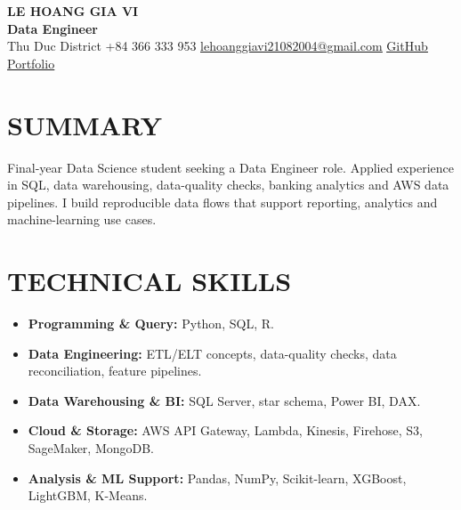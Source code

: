 \documentclass[10pt,letterpaper]{article}
\newcommand{\cvsection}[2]{\section*{\faIcon{#1}\hspace{0.45em}#2}}
\newcommand{\cvlink}[2]{\href{#1}{\underline{#2}}}
\newcommand{\cvitem}[1]{\item \small #1}
\begin{document}
\begin{center}
  {\fontsize{20}{22}\selectfont\bfseries LE HOANG GIA VI}\\[0.22em]
  {\fontsize{17}{19}\selectfont\bfseries Data Engineer}\\[0.42em]
  {\small
  \hspace{0.2em}Thu Duc District
  \quad
  \hspace{0.2em}+84 366 333 953
  \quad
  \hspace{0.2em}\cvlink{mailto:lehoanggiavi21082004@gmail.com}{lehoanggiavi21082004@gmail.com}
  \quad
  \hspace{0.2em}\cvlink{https://github.com/lehoanggiavi}{GitHub}
  \quad
  \hspace{0.2em}\cvlink{https://lehoanggiavi.github.io/portfolio/?role=de}{Portfolio}}
\end{center}

\cvsection{user}{SUMMARY}
\normalsize
Final-year Data Science student seeking a Data Engineer role. Applied experience in SQL, data
warehousing, data-quality checks, banking analytics and AWS data pipelines. I build reproducible
data flows that support reporting, analytics and machine-learning use cases.

\cvsection{tools}{TECHNICAL SKILLS}
\begin{itemize}[leftmargin=1.55em,itemsep=0em,topsep=0em,parsep=0em]
  \cvitem{\textbf{Programming \& Query:} Python, SQL, R.}
  \cvitem{\textbf{Data Engineering:} ETL/ELT concepts, data-quality checks, data reconciliation, feature pipelines.}
  \cvitem{\textbf{Data Warehousing \& BI:} SQL Server, star schema, Power BI, DAX.}
  \cvitem{\textbf{Cloud \& Storage:} AWS API Gateway, Lambda, Kinesis, Firehose, S3, SageMaker, MongoDB.}
  \cvitem{\textbf{Analysis \& ML Support:} Pandas, NumPy, Scikit-learn, XGBoost, LightGBM, K-Means.}
\end{itemize}
\end{document}
